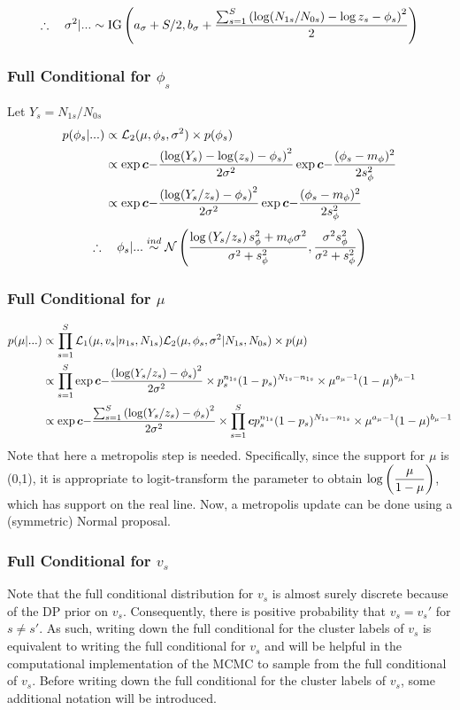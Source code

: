 \documentclass[12pt]{article}
\newcommand{\bc}{\mbox{\boldmath $c$}}
\begin{document}
$$
\therefore ~~~ \sigma^2|... \sim \text{IG}\left(a_\sigma+S/2, b_\sigma+\frac{\sum_{s=1}^S\left(\log(N_{1s}/N_{0s})-\log z_s-\phi_s\right)^2}{2}\right)
$$

\subsubsection{Full Conditional for $\phi_s$}
Let $Y_s = N_{1s}/N_{0s}$
\begin{align*}
  p(\phi_s|...) &\propto\L_2(\mu,\phi_s,\sigma^2) \times p(\phi_s)\\
                &\propto\exp\bc{-\frac{\p{\log(Y_s)-\log(z_s)-\phi_s}^2}{2\sigma^2}}
  \exp\bc{-\frac{(\phi_s-m_\phi)^2}{2s_\phi^2}}\\
                &\propto\exp\bc{-\frac{\p{\log(Y_s/z_s)-\phi_s}^2}{2\sigma^2}} 
  \exp\bc{-\frac{(\phi_s-m_\phi)^2}{2s_\phi^2}}\\
\end{align*}
$$
\therefore ~~~ \phi_s | ... \overset{ind}{\sim}  \mathcal N\left(\frac{\log\left(Y_s/z_s\right)s_\phi^2+m_\phi\sigma^2}{\sigma^2+s_\phi^2},\frac{\sigma^2 s_\phi^2}{\sigma^2+s_\phi^2}\right)
$$

\subsubsection{Full Conditional for $\mu$}
\begin{align*}
  p(\mu|...) &\propto \prods \L_1(\mu,v_s|n_{1s},N_{1s})\L_2(\mu,\phi_s,\sigma^2|N_{1s},N_{0s}) \times p(\mu) \\
             &\propto \prods \exp\bc{-\frac{\p{\log(Y_s/z_s)-\phi_s}^2}{2\sigma^2}} \times p_s^{n_{1s}} (1-p_s)^{N_{1s}-n_{1s}} \times \mu^{a_\mu-1} (1-\mu)^{b_\mu-1}\\
             &\propto \exp\bc{-\frac{\sums\p{\log(Y_s/z_s)-\phi_s}^2}{2\sigma^2}} \times \prods\bc{p_s^{n_{1s}} (1-p_s)^{N_{1s}-n_{1s}}} \times \mu^{a_\mu-1} (1-\mu)^{b_\mu-1}\\
\end{align*}
Note that here a metropolis step is needed. Specifically, since the support for
$\mu$ is (0,1), it is appropriate to logit-transform the parameter to obtain
$\log\left(\displaystyle\frac{\mu}{1-\mu}\right)$, which has support on the real line. Now, a
metropolis update can be done using a (symmetric) Normal proposal.

\subsubsection{Full Conditional for $v_s$}
Note that the full conditional distribution for $v_s$ is almost surely discrete because of the DP prior on $v_s$. 
Consequently, there is positive probability that $v_s=v_s'$ for $s\ne s'$. As such, writing down the full conditional for
the cluster labels of $v_s$ is equivalent to writing the full conditional for $v_s$ and will be helpful in the computational
implementation of the MCMC to sample from the full conditional of $v_s$. Before writing down the full conditional for the
cluster labels of $v_s$, some additional notation will be introduced.\\
\end{document}
